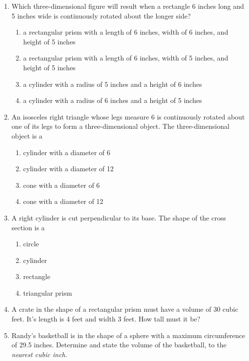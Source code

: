 \documentclass[12pt, twoside]{article}
\begin{document}
\begin{enumerate}
\newpage
\item Which three-dimensional figure will result when a rectangle 6 inches long and 5 inches wide is continuously rotated about the longer side?
    \begin{enumerate}
      \item a rectangular prism with a length of 6 inches, width of 6 inches, and height of 5 inches
      \item a rectangular prism with a length of 6 inches, width of 5 inches, and height of 5 inches
      \item a cylinder with a radius of 5 inches and a height of 6 inches
      \item a cylinder with a radius of 6 inches and a height of 5 inches
    \end{enumerate}

\item An isosceles right triangle whose legs measure 6 is continuously rotated about one of its legs to form a three-dimensional object. The three-dimensional object is a
    \begin{enumerate}
      \item cylinder with a diameter of 6
      \item cylinder with a diameter of 12
      \item cone with a diameter of 6
      \item cone with a diameter of 12
    \end{enumerate}

\item A right cylinder is cut perpendicular to its base. The shape of the cross section is a
    \begin{enumerate}
      \item circle
      \item cylinder
      \item rectangle
      \item triangular prism
    \end{enumerate} \vspace{2cm}

\item A crate in the shape of a rectangular prism must have a volume of 30 cubic feet. It's length is 4 feet and width 3 feet. How tall must it be? \vspace{3.0cm}

\newpage
\item Randy’s basketball is in the shape of a sphere with a maximum circumference of 29.5 inches. Determine and state the volume of the basketball, to the \emph{nearest cubic inch}. \vspace{4cm}
  

\end{enumerate}
\end{document}

